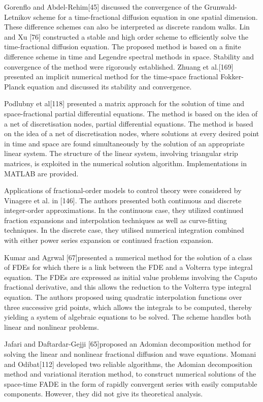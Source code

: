{Gorenflo and Abdel-Rehim[45] discussed the convergence of the Grunwald-Letnikov scheme for a time-fractional diffusion equation in one spatial dimension. These difference schemes can also be interpreted as discrete random walks. Lin and Xu [76] constructed a stable and high order scheme to efficiently solve the time-fractional diffusion equation. The proposed method is based on a finite difference scheme in time and Legendre spectral methods in space. Stability and convergence of the method were rigorously established. Zhuang et al.[169] presented an implicit numerical method for the time-space fractional Fokker-Planck equation and discussed its stability and convergence.\

Podlubny et al[118] presented a matrix approach for the solution of time and space-fractional partial differential equations. The method is based on the idea of a net of discretisation nodes, partial differential equations. The method is based on the idea of a net of discretisation nodes, where solutions at every desired point in time and space are found simultaneously by the solution of an appropriate linear system. The structure of the linear system, involving triangular strip matrices, is exploited in the numerical solution algorithm. Implementations in MATLAB are provided.\

Applications of fractional-order models to control theory were considered by Vinagere et al. in [146]. The authors presented both continuous and discrete integer-order approximations. In the continuous case, they utilized continued fraction expansions and interpolation techniques as well as curve-fitting techniques. In the discrete case, they utilised numerical integration combined with either power series expansion or continued fraction expansion.\

Kumar and Agrwal [67]presented a numerical method for the solution of a class of FDEs for which there is a link between the FDE and a Volterra type integral equation. The FDEs are expressed as initial value problems involving the Caputo fractional derivative, and this allows the reduction to the Volterra type integral equation. The authors proposed using quadratic interpolation functions over three successive grid points, which allows the integrals to be computed, thereby yielding a system of algebraic equations to be solved. The scheme handles both linear and nonlinear problems.\

Jafari and Daftardar-Gejji [65]proposed an Adomian decomposition method for solving the linear and nonlinear fractional diffusion and wave equations. Momani and Odibat[112] developed two reliable algorithms, the Adomian decomposition method and variational iteration method, to construct numerical solutions of the space-time FADE in the form of rapidly convergent series with easily computable components. However, they did not give its theoretical analysis.\

}
